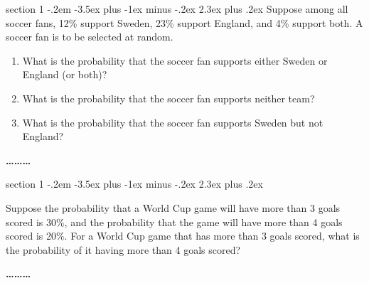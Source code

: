 \documentclass[11pt]{article}
\makeatletter
\newenvironment{problem}{\@startsection
       {section}
       {1}
       {-.2em}
       {-3.5ex plus -1ex minus -.2ex}
       {2.3ex plus .2ex}
       {\pagebreak[3]%
       \large\bf\noindent{Problem }
       }
       }
       {%
       \begin{center}\large\bf \ldots\ldots\ldots\end{center}}
\makeatother
\begin{document}
\begin{problem}{}
Suppose among all soccer fans, 12\% support  Sweden, 23\% support  England, and 4\% support both. A soccer fan is to be selected at random.
\begin{enumerate}

\item What is the probability that the soccer fan supports either  Sweden or  England (or both)?

\item What is the probability that the soccer fan supports neither team?

\item What is the probability that the soccer fan supports  Sweden but not  England?
\end{enumerate}
\end{problem}

\begin{problem}{}

Suppose the probability that a World Cup game will have more than 3 goals scored is 30\%, and the probability that the game will have more than 4 goals scored is 20\%.
For a World Cup game that has more than 3 goals scored, what is the
probability of it having more than 4 goals scored? 
\end{problem}
\end{document}
